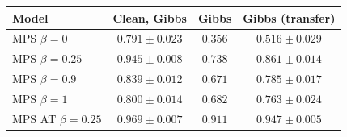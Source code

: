 \begin{tabular}{lccc}
\toprule
Model & Clean, Gibbs & Gibbs & Gibbs (transfer) \\
\midrule
MPS $\beta=0$ & $0.791 \pm 0.023$ & $0.356$ & $0.516 \pm 0.029$ \\
MPS $\beta=0.25$ & $0.945 \pm 0.008$ & $0.738$ & $0.861 \pm 0.014$ \\
MPS $\beta=0.9$ & $0.839 \pm 0.012$ & $0.671$ & $0.785 \pm 0.017$ \\
MPS $\beta=1$ & $0.800 \pm 0.014$ & $0.682$ & $0.763 \pm 0.024$ \\
MPS AT $\beta=0.25$ & $0.969 \pm 0.007$ & $\mathbf{0.911}$ & $0.947 \pm 0.005$ \\
\bottomrule
\end{tabular}
